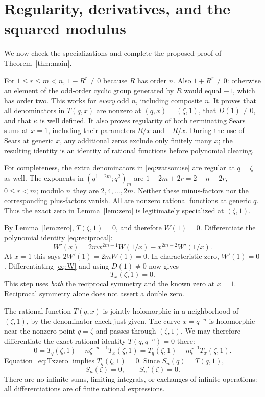 \documentclass[11pt]{article}
\newcommand{\qp}[3]{(#1;#2)_{#3}}
\begin{document}
\section{Regularity, derivatives, and the squared modulus}
We now check the specializations and complete the proposed proof of
Theorem~\ref{thm:main}.

For $1\leq r\leq m<n$, $1-R^r\ne0$ because $R$ has order $n$.
Also $1+R^r\ne0$: otherwise an element of the odd-order cyclic group
generated by $R$ would equal $-1$, which has order two. This works for
\emph{every} odd $n$, including composite $n$.
It proves that all denominators in $T(q,x)$ are nonzero at $(q,x)=(\zeta,1)$,
that $D(1)\ne0$, and that $\kappa$ is well defined. It also proves
regularity of both terminating Sears sums at $x=1$, including their
parameters $R/x$ and $-R/x$. During the use of Sears at generic $x$, any
additional zeros exclude only finitely many $x$; the resulting identity
is an identity of rational functions before polynomial clearing.

For completeness, the extra denominators in \eqref{eq:watsonuse} are
regular at $q=\zeta$ as well. The exponents in
$\qp{q^{1-2m}}{q^2}{m}$ are $1-2m+2r=2-n+2r$, $0\leq r<m$;
modulo $n$ they are $2,4,\ldots,2m$. Neither these minus-factors nor the
corresponding plus-factors vanish. All are nonzero rational functions
at generic $q$. Thus the exact zero in Lemma~\ref{lem:zero} is legitimately
specialized at $(\zeta,1)$.

By Lemma~\ref{lem:zero}, $T(\zeta,1)=0$, and therefore $W(1)=0$.
Differentiate the polynomial identity \eqref{eq:reciprocal}:
\[
 W'(x)=2m x^{2m-1}W(1/x)-x^{2m-2}W'(1/x).
\]
At $x=1$ this says $2W'(1)=2mW(1)=0$. In characteristic zero,
$W'(1)=0$. Differentiating \eqref{eq:W} and using $D(1)\ne0$ now gives
\begin{equation}\label{eq:Txzero}
 T_x(\zeta,1)=0.
\end{equation}
This step uses \emph{both} the reciprocal symmetry and the known zero at
$x=1$. Reciprocal symmetry alone does not assert a double zero.

The rational function $T(q,x)$ is jointly holomorphic in a neighborhood
of $(\zeta,1)$, by the denominator check just given. The curve
$x=q^{-n}$ is holomorphic near the nonzero point $q=\zeta$ and passes
through $(\zeta,1)$. We may therefore differentiate the exact rational
identity $T(q,q^{-n})=0$ there:
\begin{equation}\label{eq:chain}
 0=T_q(\zeta,1)-n\zeta^{-n-1}T_x(\zeta,1)
   =T_q(\zeta,1)-n\zeta^{-1}T_x(\zeta,1).
\end{equation}
Equation~\eqref{eq:Txzero} implies $T_q(\zeta,1)=0$.
Since $S_n(q)=T(q,1)$,
\[
 S_n(\zeta)=0,\qquad S_n'(\zeta)=0.
\]
There are no infinite sums, limiting integrals, or exchanges of infinite
operations: all differentiations are of finite rational expressions.
\end{document}
